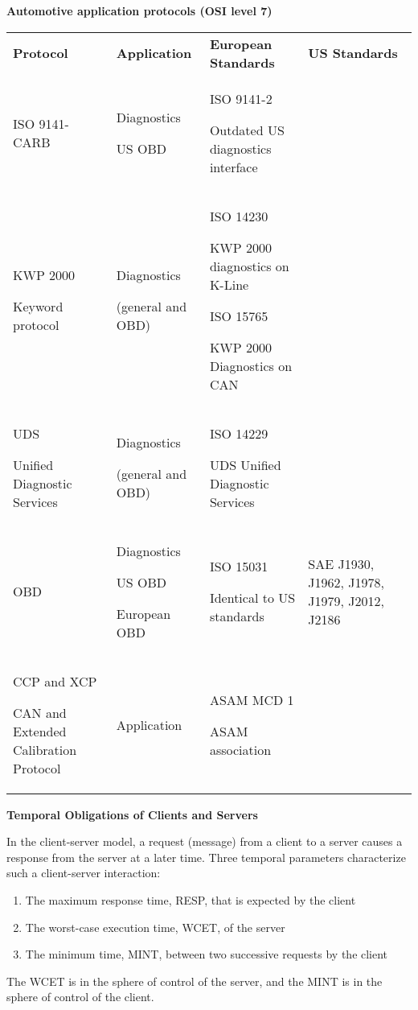 \textbf{Automotive application protocols (OSI level 7)}

\begin{longtable}[c]{@{}llll@{}}
\toprule
\textbf{Protocol} & \textbf{Application} & \textbf{European Standards} &
\textbf{US Standards}\tabularnewline
ISO 9141-CARB & Diagnostics

US OBD & ISO 9141-2

Outdated US diagnostics interface &\tabularnewline
KWP 2000

Keyword protocol & Diagnostics

(general and OBD) & ISO 14230

KWP 2000 diagnostics on K-Line

ISO 15765

KWP 2000 Diagnostics on CAN &\tabularnewline
UDS

Unified Diagnostic Services & Diagnostics

(general and OBD) & ISO 14229

UDS Unified Diagnostic Services &\tabularnewline
OBD & Diagnostics

US OBD

European OBD & ISO 15031

Identical to US standards & SAE J1930, J1962, J1978, J1979, J2012,
J2186\tabularnewline
CCP and XCP

CAN and Extended Calibration Protocol & Application & ASAM MCD 1

ASAM association &\tabularnewline
\bottomrule
\end{longtable}

\textbf{Temporal Obligations of Clients and Servers}

In the client-server model, a request (message) from a client to a
server causes a response from the server at a later time. Three temporal
parameters characterize such a client-server interaction:

\begin{enumerate}
\def\labelenumi{\arabic{enumi}.}
\item
  The maximum response time, RESP, that is expected by the client
\item
  The worst-case execution time, WCET, of the server
\item
  The minimum time, MINT, between two successive requests by the client
\end{enumerate}

The WCET is in the sphere of control of the server, and the MINT is in
the sphere of control of the client.

